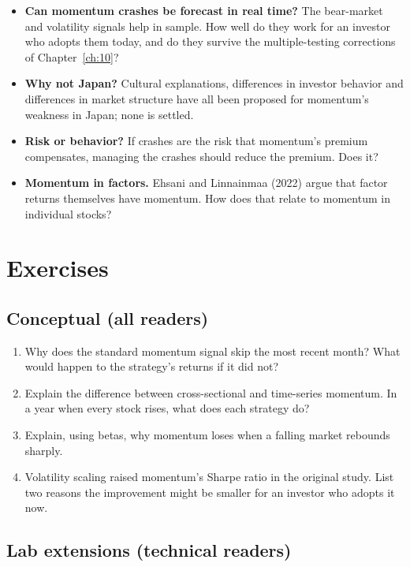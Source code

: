 \begin{itemize}
  \item \textbf{Can momentum crashes be forecast in real time?} The bear-market and volatility signals help in sample. How well do they work for an investor who adopts them today, and do they survive the multiple-testing corrections of Chapter~\ref{ch:10}?
  \item \textbf{Why not Japan?} Cultural explanations, differences in investor behavior and differences in market structure have all been proposed for momentum's weakness in Japan; none is settled.
  \item \textbf{Risk or behavior?} If crashes are the risk that momentum's premium compensates, managing the crashes should reduce the premium. Does it?
  \item \textbf{Momentum in factors.} Ehsani and Linnainmaa (2022) argue that factor returns themselves have momentum. How does that relate to momentum in individual stocks?
\end{itemize}

\section*{Exercises}

\subsection*{Conceptual (all readers)}

\begin{enumerate}
  \item Why does the standard momentum signal skip the most recent month? What would happen to the strategy's returns if it did not?
  \item Explain the difference between cross-sectional and time-series momentum. In a year when every stock rises, what does each strategy do?
  \item Explain, using betas, why momentum loses when a falling market rebounds sharply.
  \item Volatility scaling raised momentum's Sharpe ratio in the original study. List two reasons the improvement might be smaller for an investor who adopts it now.
\end{enumerate}

\subsection*{Lab extensions (technical readers)}

